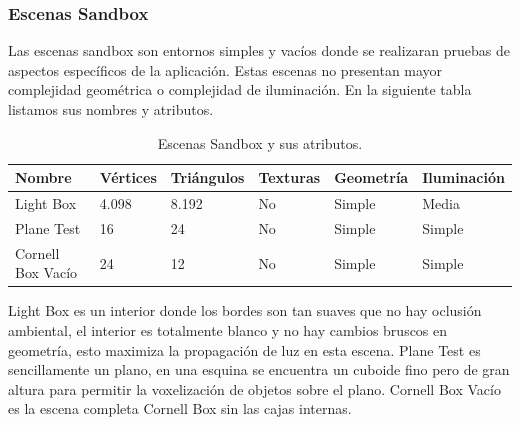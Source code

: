 \subsubsection{Escenas Sandbox}

Las escenas sandbox son entornos simples y vacíos donde se realizaran pruebas de aspectos específicos de la aplicación. Estas escenas no presentan mayor complejidad geométrica o complejidad de iluminación. En la siguiente tabla listamos sus nombres y atributos.

\begin{table}[h]
\centering
\label{my-label}
\begin{tabular}{|l|l|l|l|l|l|}
\hline
Nombre            & Vértices & Triángulos & Texturas & Geometría & Iluminación \\ \hline
Light Box         & 4.098    & 8.192      & No       & Simple    & Media        \\ \hline
Plane Test        & 16       & 24         & No       & Simple    & Simple       \\ \hline
Cornell Box Vacío & 24       & 12         & No       & Simple    & Simple       \\ \hline
\end{tabular}
\caption{Escenas Sandbox y sus atributos.}
\end{table}

Light Box es un interior donde los bordes son tan suaves que no hay oclusión ambiental, el interior es totalmente blanco y no hay cambios bruscos en geometría, esto maximiza la propagación de luz en esta escena. Plane Test es sencillamente un plano, en una esquina se encuentra un cuboide fino pero de gran altura para permitir la voxelización de objetos sobre el plano. Cornell Box Vacío es la escena completa Cornell Box sin las cajas internas.

